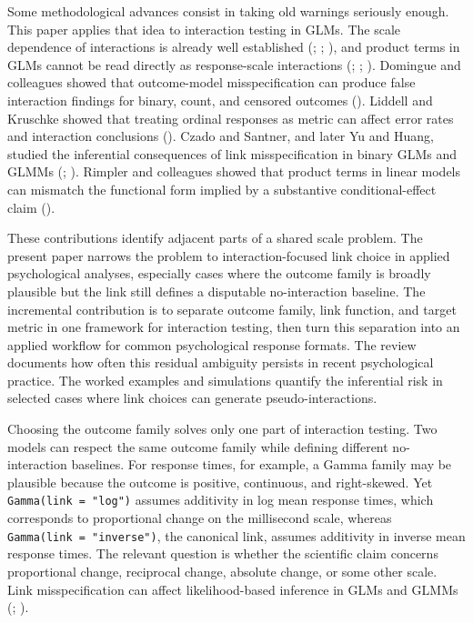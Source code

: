 \documentclass[
  man,
  longtable,
  nolmodern,
  notxfonts,
  notimes,
  colorlinks=true,linkcolor=blue,citecolor=blue,urlcolor=blue]{apa7}
\begin{document}
Some methodological advances consist in taking old warnings seriously
enough. This paper applies that idea to interaction testing in GLMs. The
scale dependence of interactions is already well established
(; ; ), and
product terms in GLMs cannot be read directly as response-scale
interactions (;
;
). Domingue and colleagues showed
that outcome-model misspecification can produce false interaction
findings for binary, count, and censored outcomes
(). Liddell and
Kruschke showed that treating ordinal responses as metric can affect
error rates and interaction conclusions
(). Czado
and Santner, and later Yu and Huang, studied the inferential
consequences of link misspecification in binary GLMs and GLMMs
(;
). Rimpler and colleagues
showed that product terms in linear models can mismatch the functional
form implied by a substantive conditional-effect claim
().

These contributions identify adjacent parts of a shared scale problem.
The present paper narrows the problem to interaction-focused link choice
in applied psychological analyses, especially cases where the outcome
family is broadly plausible but the link still defines a disputable
no-interaction baseline. The incremental contribution is to separate
outcome family, link function, and target metric in one framework for
interaction testing, then turn this separation into an applied workflow
for common psychological response formats. The review documents how
often this residual ambiguity persists in recent psychological practice.
The worked examples and simulations quantify the inferential risk in
selected cases where link choices can generate pseudo-interactions.

Choosing the outcome family solves only one part of interaction testing.
Two models can respect the same outcome family while defining different
no-interaction baselines. For response times, for example, a Gamma
family may be plausible because the outcome is positive, continuous, and
right-skewed. Yet \texttt{Gamma(link\ =\ "log")} assumes additivity in
log mean response times, which corresponds to proportional change on the
millisecond scale, whereas \texttt{Gamma(link\ =\ "inverse")}, the
canonical link, assumes additivity in inverse mean response times. The
relevant question is whether the scientific claim concerns proportional
change, reciprocal change, absolute change, or some other scale. Link
misspecification can affect likelihood-based inference in GLMs and GLMMs
(;
).
\end{document}
